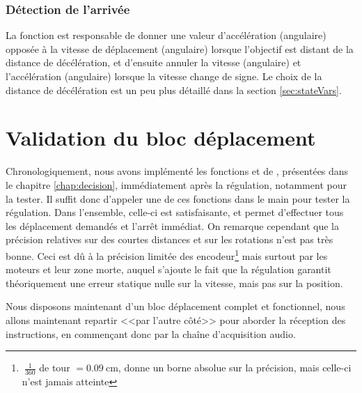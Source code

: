 \subsubsection{Détection de l'arrivée}
La fonction  est responsable de donner une valeur d'accélération (angulaire) opposée à la vitesse de déplacement (angulaire) lorsque l'objectif est distant de la distance de décélération, et d'ensuite annuler la vitesse (angulaire) et l'accélération (angulaire) lorsque la vitesse change de signe. Le choix de la distance de décélération est un peu plus détaillé dans la section \ref{sec:stateVars}.

\section{Validation du bloc déplacement}
Chronologiquement, nous avons implémenté les fonctions  et  de , présentées dans le chapitre \ref{chap:decision}, immédiatement après la régulation, notamment pour la tester. Il suffit donc d'appeler une de ces fonctions dans le main pour tester la régulation. Dans l'ensemble, celle-ci est satisfaisante, et permet d'effectuer tous les déplacement demandés et l'arrêt immédiat. On remarque cependant que la précision relatives sur des courtes distances et sur les rotations n'est pas très bonne. Ceci est dû à la précision limitée des encodeur\footnote{$~\frac{1}{360}$ de tour $ = \SI{0.09}{\centi\meter}$, donne un borne absolue sur la précision, mais celle-ci n'est jamais atteinte} mais surtout par les moteurs et leur zone morte, auquel s'ajoute le fait que la régulation garantit théoriquement une erreur statique nulle sur la vitesse, mais pas sur la position.

Nous disposons maintenant d'un bloc déplacement complet et fonctionnel, nous allons maintenant repartir <<par l'autre côté>> pour aborder la réception des instructions, en commençant donc par la chaîne d'acquisition audio.
